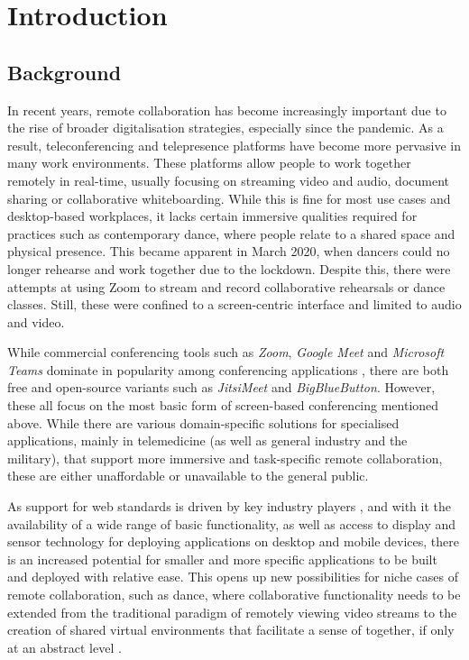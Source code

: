 \chapter{Introduction}

\section{Background}

In recent years, remote collaboration has become increasingly important due to the rise of broader digitalisation strategies, especially since the pandemic. As a result, teleconferencing and telepresence platforms have become more pervasive in many work environments. These platforms allow people to work together remotely in real-time, usually focusing on streaming video and audio, document sharing or collaborative whiteboarding. While this is fine for most use cases and desktop-based workplaces, it lacks certain immersive qualities required for practices such as contemporary dance, where people relate to a shared space and physical presence. This became apparent in March 2020, when dancers could no longer rehearse and work together due to the lockdown. Despite this, there were attempts at using Zoom to stream and record collaborative rehearsals or dance classes. Still, these were confined to a screen-centric interface and limited to audio and video.

While commercial conferencing tools such as \emph{Zoom}, \emph{Google Meet} and \emph{Microsoft Teams} dominate in popularity among conferencing applications \parencite{mostPopularConferencingPlatforms}, there are both free and open-source variants such as \emph{JitsiMeet} and \emph{BigBlueButton}. However, these all focus on the most basic form of screen-based conferencing mentioned above. While there are various domain-specific solutions for specialised applications, mainly in telemedicine (as well as general industry and the military), that support more immersive and task-specific remote collaboration, these are either unaffordable or unavailable to the general public.

As support for web standards is driven by key industry players \parencite{pushingInteroperabilityForward}, and with it the availability of a wide range of basic functionality, as well as access to display and sensor technology for deploying applications on desktop and mobile devices, there is an increased potential for smaller and more specific applications to be built and deployed with relative ease. This opens up new possibilities for niche cases of remote collaboration, such as dance, where collaborative functionality needs to be extended from the traditional paradigm of remotely viewing video streams to the creation of shared virtual environments that facilitate a sense of  together, if only at an abstract level \parencite{surveyOfPresence}.

